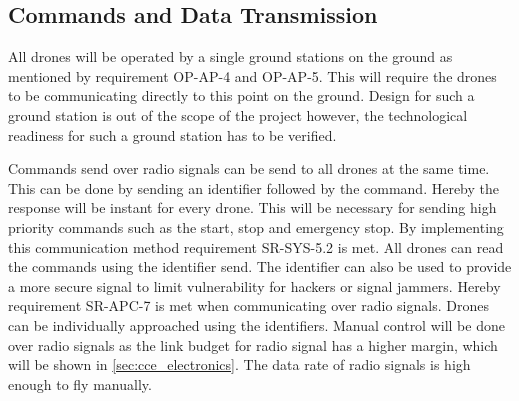 \subsection{Commands and Data Transmission} 
\label{subsec:cce_comdatatrans}
All drones will be operated by a single ground stations on the ground as mentioned by requirement OP-AP-4 and OP-AP-5. This will require the drones to be communicating directly to this point on the ground. Design for such a ground station is out of the scope of the project however, the technological readiness for such a ground station has to be verified.

Commands send over radio signals can be send to all drones at the same time. This can be done by sending an identifier followed by the command. Hereby the response will be instant for every drone. This will be necessary for sending high priority commands such as the start, stop and emergency stop. By implementing this communication method requirement SR-SYS-5.2 is met. All drones can read the commands using the identifier send. The identifier can also be used to provide a more secure signal to limit vulnerability for hackers or signal jammers. Hereby requirement SR-APC-7 is met when communicating over radio signals. Drones can be individually approached using the identifiers. Manual control will be done over radio signals as the link budget for radio signal has a higher margin, which will be shown in \autoref{sec:cce_electronics}. The data rate of radio signals is high enough to fly manually.


